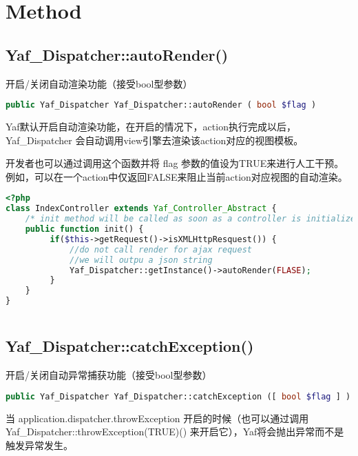 \section{Method}


\subsection{Yaf\_Dispatcher::autoRender()}

开启/关闭自动渲染功能（接受bool型参数）

\begin{lstlisting}[language=PHP]
public Yaf_Dispatcher Yaf_Dispatcher::autoRender ( bool $flag )
\end{lstlisting}

Yaf默认开启自动渲染功能，在开启的情况下，action执行完成以后，Yaf\_Dispatcher 会自动调用view引擎去渲染该action对应的视图模板。 

开发者也可以通过调用这个函数并将 flag 参数的值设为TRUE来进行人工干预。例如，可以在一个action中仅返回FALSE来阻止当前action对应视图的自动渲染。


\begin{lstlisting}[language=PHP]
<?php
class IndexController extends Yaf_Controller_Abstract {
    /* init method will be called as soon as a controller is initialized */ 
    public function init() {
         if($this->getRequest()->isXMLHttpResquest()) {
             //do not call render for ajax request
             //we will outpu a json string
             Yaf_Dispatcher::getInstance()->autoRender(FLASE);
         }
    }
}
\end{lstlisting}



\begin{lstlisting}[language=PHP]

\end{lstlisting}

\subsection{Yaf\_Dispatcher::catchException()}

开启/关闭自动异常捕获功能（接受bool型参数）


\begin{lstlisting}[language=PHP]
public Yaf_Dispatcher Yaf_Dispatcher::catchException ([ bool $flag ] )
\end{lstlisting}

当 application.dispatcher.throwException 开启的时候（也可以通过调用 Yaf\_Dispatcher::throwException(TRUE)() 来开启它），Yaf将会抛出异常而不是触发异常发生。

